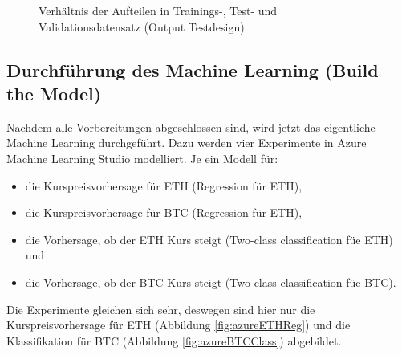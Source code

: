 \begin{figure}[H]
\centering
{}
\caption{Verhältnis der Aufteilen in Trainings-, Test- und Validationsdatensatz (Output Testdesign)}
\label{fig:ratio}
\end{figure}

\subsection*{Durchführung des Machine Learning (Build the Model)}
Nachdem alle Vorbereitungen abgeschlossen sind, wird jetzt das eigentliche Machine Learning durchgeführt. Dazu werden vier Experimente in Azure Machine Learning Studio modelliert. Je ein Modell für:
\begin{itemize}
\item die Kurspreisvorhersage für ETH (Regression für ETH),
\item die Kurspreisvorhersage für BTC (Regression für ETH),
\item die Vorhersage, ob der ETH Kurs steigt (Two-class classification füe ETH) und
\item die Vorhersage, ob der BTC Kurs steigt (Two-class classification füe BTC).
\end{itemize}
Die Experimente gleichen sich sehr, deswegen sind hier nur die Kurspreisvorhersage für ETH (Abbildung \ref{fig:azureETHReg}) und die Klassifikation für BTC (Abbildung \ref{fig:azureBTCClass}) abgebildet.

